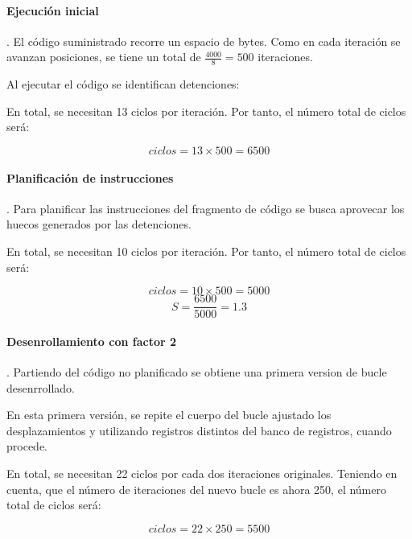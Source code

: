 \begin{acsolution}\end{acsolution}

\paragraph{Ejecución inicial}. 
El código suministrado recorre un espacio de  bytes.
Como en cada iteración se avanzan  posiciones, se tiene
un total de $\frac{4000}{8} = 500$ iteraciones.

Al ejecutar el código se identifican detenciones:



En total, se necesitan 13 ciclos por iteración.
Por tanto, el número total de ciclos será:

\[
ciclos = 13 \times 500 = 6500
\]

\paragraph{Planificación de instrucciones}.
Para planificar las instrucciones del fragmento de código se busca aprovecar los
huecos generados por las detenciones.



En total, se necesitan 10 ciclos por iteración.
Por tanto, el número total de ciclos será:

\[
ciclos = 10 \times 500 = 5000
\]
\[
S = \frac{6500}{5000} = 1.3
\]

\paragraph{Desenrollamiento con factor 2}.
Partiendo del código no planificado se obtiene una primera
version de bucle desenrrollado.



En esta primera versión, se repite el cuerpo del bucle ajustado los
desplazamientos y utilizando registros distintos del banco de registros,
cuando procede.

En total, se necesitan 22 ciclos por cada dos iteraciones originales.
Teniendo en cuenta, que el número de iteraciones del nuevo bucle es ahora 250,
el número total de ciclos será:

\[
ciclos = 22 \times 250 = 5500
\]


